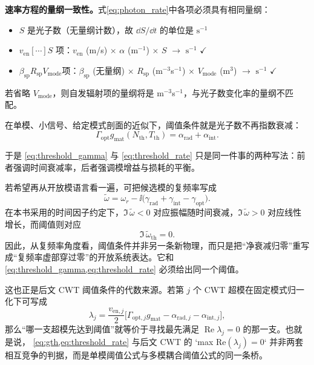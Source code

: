 \begin{notebox}
\textbf{速率方程的量纲一致性。}式\cref{eq:photon_rate}中各项必须具有相同量纲：
\begin{itemize}
  \item $S$ 是光子数（无量纲计数），故 $\dd S/\dd t$ 的单位是 $\mathrm{s}^{-1}$
  \item $v_{\mathrm{en}}[\cdots]S$ 项：$v_{\mathrm{en}}$ (m/s) $\times$ $\alpha$ (m$^{-1}$) $\times$ $S$ $\rightarrow$ $\mathrm{s}^{-1}$ $\checkmark$
  \item $\beta_{\mathrm{sp}}R_{\mathrm{sp}} V_{\mathrm{mode}}$项：$\beta_{\mathrm{sp}}$ (无量纲) $\times$ $R_{\mathrm{sp}}$ (m$^{-3}$s$^{-1}$) $\times$ $V_{\mathrm{mode}}$ (m$^3$) $\rightarrow$ $\mathrm{s}^{-1}$ $\checkmark$
\end{itemize}
若省略 $V_{\mathrm{mode}}$，则自发辐射项的量纲将是 m$^{-3}$s$^{-1}$，与光子数变化率的量纲不匹配。
\end{notebox}

在单模、小信号、给定模式剖面的近似下，阈值条件就是光子数不再指数衰减：
\begin{equation}
\Gamma_{\mathrm{opt}} g_{\mathrm{mat}}(N_{\mathrm{th}},T_{\mathrm{th}})=\alpha_{\mathrm{rad}}+\alpha_{\mathrm{int}}.
\label{eq:threshold_rate}
\end{equation}

于是 \cref{eq:threshold_gamma} 与 \cref{eq:threshold_rate} 只是同一件事的两种写法：前者强调时间衰减率，后者强调模增益与损耗的平衡。

若希望再从开放模语言看一遍，可把候选模的复频率写成
\begin{equation}
\tilde{\omega}
=
\omega_r-\ii\bigl(\gamma_{\mathrm{rad}}+\gamma_{\mathrm{int}}-\gamma_{\mathrm{opt}}\bigr).
\label{eq:complex_omega_threshold}
\end{equation}
在本书采用的时间因子约定下，$\Im\,\tilde{\omega}<0$ 对应振幅随时间衰减，$\Im\,\tilde{\omega}>0$ 对应线性增长，而阈值则对应
\begin{equation}
\Im\,\tilde{\omega}_{\mathrm{th}}=0.
\label{eq:complex_threshold_condition}
\end{equation}
因此，从复频率角度看，阈值条件并非另一条新物理，而只是把“净衰减归零”重写成“复频率虚部穿过零”的开放系统表达。它和 \cref{eq:threshold_gamma,eq:threshold_rate} 必须给出同一个阈值。

这也正是后文 CWT 阈值条件的代数来源。若第 $j$ 个 CWT 超模在固定模式归一化下可写成
\begin{equation}
\lambda_j
=
 \frac{v_{\mathrm{en},j}}{2}
\bigl[
\Gamma_{\mathrm{opt},j} g_{\mathrm{mat}}
-\alpha_{\mathrm{rad},j}
-\alpha_{\mathrm{int},j}
\bigr],
\label{eq:cwt_threshold_bridge_ch7}
\end{equation}
那么“哪一支超模先达到阈值”就等价于寻找最先满足
$\operatorname{Re}\lambda_j=0$ 的那一支。也就是说，
\cref{eq:gth,eq:threshold_rate} 与后文 CWT 的 `max Re$(\lambda_j)=0$` 并非两套
相互竞争的判据，而是单模阈值公式与多模耦合阈值公式的同一条桥。

